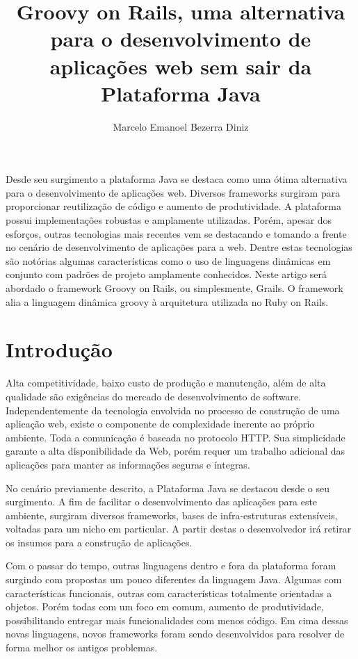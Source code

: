 \documentclass[12pt]{article}
\title{Groovy on Rails, uma alternativa para o desenvolvimento de aplicações web
       sem sair da Plataforma Java}
\author{Marcelo Emanoel Bezerra Diniz\inst{1}}
\begin{document}
 

\maketitle

\begin{resumo} 
    
    Desde seu surgimento a plataforma Java se destaca como uma ótima alternativa
    para o desenvolvimento de aplicações web. Diversos frameworks surgiram para 
    proporcionar reutilização de código e aumento de produtividade. A plataforma
    possui implementações robustas e amplamente utilizadas. Porém, apesar dos 
    esforços, outras tecnologias mais recentes vem se destacando e tomando a 
    frente no cenário de desenvolvimento de aplicações para a web. Dentre estas 
    tecnologias são notórias algumas características como o uso de linguagens 
    dinâmicas em conjunto com padrões de projeto amplamente conhecidos. Neste 
    artigo será abordado o framework Groovy on Rails, ou simplesmente, Grails. 
    O framework alia a linguagem dinâmica groovy
    à arquitetura utilizada no Ruby on Rails. \nocite{*}
    
\end{resumo}

\section{Introdução}

    Alta competitividade, baixo custo de produção e manutenção, além de alta 
    qualidade são exigências do mercado de desenvolvimento de software. 
    Independentemente da tecnologia envolvida no processo de construção de uma 
    aplicação web, existe o componente de complexidade inerente ao próprio 
    ambiente. Toda a comunicação é baseada no protocolo HTTP. Sua simplicidade 
    garante a alta disponibilidade da Web, porém requer um trabalho adicional 
    das aplicações para manter as informações seguras e íntegras.

    No cenário previamente descrito, a Plataforma Java se destacou desde o seu 
    surgimento. A fim de facilitar o desenvolvimento das aplicações para este 
    ambiente, surgiram diversos frameworks, bases de infra-estruturas 
    extensíveis, voltadas para um nicho em particular. A partir destas o 
    desenvolvedor irá retirar os insumos para a construção de aplicações.

    Com o passar do tempo, outras linguagens dentro e fora da plataforma foram 
    surgindo com propostas um pouco diferentes da linguagem Java. Algumas com 
    características funcionais, outras com características totalmente orientadas 
    a objetos. Porém todas com um foco em comum, aumento de produtividade, 
    possibilitando entregar mais funcionalidades com menos código. Em cima 
    dessas novas linguagens, novos frameworks foram sendo desenvolvidos para 
    resolver de forma melhor os antigos problemas.
    
\end{document}
